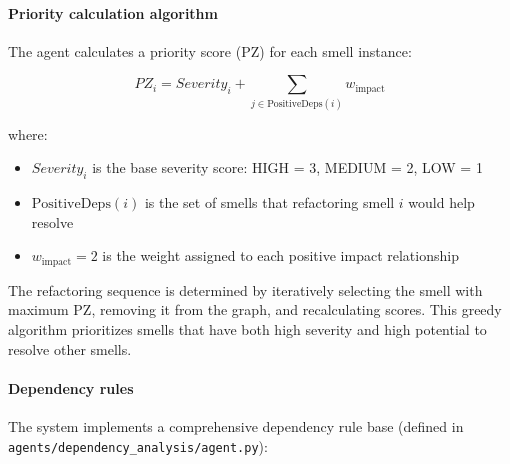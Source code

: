 \paragraph{Priority calculation algorithm}

The agent calculates a priority score (PZ) for each smell instance:

\begin{equation}
    PZ_i = Severity_i + \sum_{j \in \text{PositiveDeps}(i)} w_{\text{impact}}
\end{equation}

where:
\begin{itemize}
    \item $Severity_i$ is the base severity score: HIGH = 3, MEDIUM = 2, LOW = 1
    \item $\text{PositiveDeps}(i)$ is the set of smells that refactoring smell $i$ would help resolve
    \item $w_{\text{impact}} = 2$ is the weight assigned to each positive impact relationship
\end{itemize}

The refactoring sequence is determined by iteratively selecting the smell with maximum PZ, removing it from the graph, and recalculating scores. This greedy algorithm prioritizes smells that have both high severity and high potential to resolve other smells.

\paragraph{Dependency rules}

The system implements a comprehensive dependency rule base (defined in \texttt{agents/dependency\_analysis/agent.py}):

